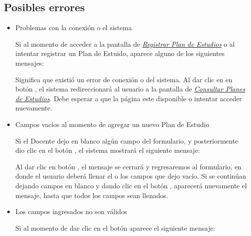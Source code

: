 \subsection{Posibles errores}
\begin{itemize}

    \item Problemas con la conexión o el sistema

    Si al momento de acceder a la pantalla de \hyperlink{registrarPE}{\textit{Registrar Plan de Estudios}} o al intentar registrar un Plan de Estuido, aparece alguno de los siguientes mensajes:

    Significa que existió un error de conexión o del sistema. Al dar clic en en botón , el sistema redireccionará al usuario a la pantalla de \hyperlink{consultarPE}{\textit{Consultar Planes de Estudios}}. Debe esperar a que la página este disponible o intentar acceder nuevamente.

    \item Campos vacíos al momento de agregar un nuevo Plan de Estudio

    Si el Docente dejo en blanco algún campo del formulario, y posteriormente dio clic en el botón , el sistema mostrará el siguiente mensaje:

    Al dar clic en botón , el mensaje se cerrará y regresaremos al formulario, en donde el usuario deberá llenar el o los campos que dejo vacío. Si se continúan dejando campos en blanco y dando clic en el botón , aparecerá nuevamente el mensaje, hasta que todos los campos sean llenados.\\



    \item Los campos ingresados no son válidos

    Si al momento de dar clic en el botón  aparece el siguiente mensaje:


\end{itemize}
